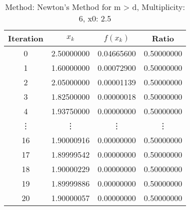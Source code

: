 \begin{table}
\centering
\caption{Method: Newton's Method for m > d, Multiplicity: 6, x0: 2.5}
\label{tab:table_Newton's_Method_for_m_>_d_6_2_5}
\begin{tabular}{c c c c}
\toprule
Iteration &      $x_k$ &   $f(x_k)$ &      Ratio \\
\midrule
        0 & 2.50000000 & 0.04665600 & 0.50000000 \\
        1 & 1.60000000 & 0.00072900 & 0.50000000 \\
        2 & 2.05000000 & 0.00001139 & 0.50000000 \\
        3 & 1.82500000 & 0.00000018 & 0.50000000 \\
        4 & 1.93750000 & 0.00000000 & 0.50000000 \\
   \vdots &     \vdots &     \vdots &     \vdots \\
       16 & 1.90000916 & 0.00000000 & 0.50000000 \\
       17 & 1.89999542 & 0.00000000 & 0.50000000 \\
       18 & 1.90000229 & 0.00000000 & 0.50000000 \\
       19 & 1.89999886 & 0.00000000 & 0.50000000 \\
       20 & 1.90000057 & 0.00000000 & 0.50000000 \\
\bottomrule
\end{tabular}
\end{table}
